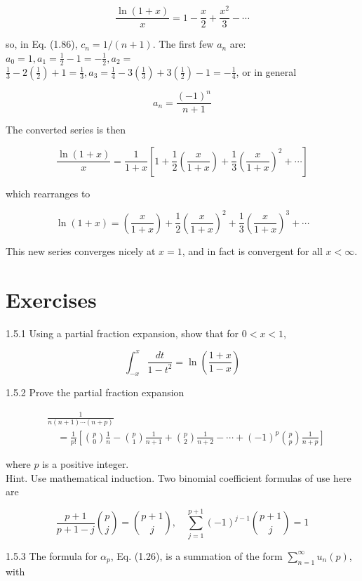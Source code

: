 \documentclass[10pt]{article}
\begin{document}
\begin{equation*}
\frac{\ln (1+x)}{x}=1-\frac{x}{2}+\frac{x^{2}}{3}-\cdots \tag{1.89}
\end{equation*}


so, in Eq. (1.86), $c_{n}=1 /(n+1)$. The first few $a_{n}$ are: $a_{0}=1, a_{1}=\frac{1}{2}-1=-\frac{1}{2}, a_{2}=$ $\frac{1}{3}-2\left(\frac{1}{2}\right)+1=\frac{1}{3}, a_{3}=\frac{1}{4}-3\left(\frac{1}{3}\right)+3\left(\frac{1}{2}\right)-1=-\frac{1}{4}$, or in general

$$
a_{n}=\frac{(-1)^{n}}{n+1}
$$

The converted series is then

$$
\frac{\ln (1+x)}{x}=\frac{1}{1+x}\left[1+\frac{1}{2}\left(\frac{x}{1+x}\right)+\frac{1}{3}\left(\frac{x}{1+x}\right)^{2}+\cdots\right]
$$

which rearranges to


\begin{equation*}
\ln (1+x)=\left(\frac{x}{1+x}\right)+\frac{1}{2}\left(\frac{x}{1+x}\right)^{2}+\frac{1}{3}\left(\frac{x}{1+x}\right)^{3}+\cdots \tag{1.90}
\end{equation*}


This new series converges nicely at $x=1$, and in fact is convergent for all $x<\infty$.

\section*{Exercises}
1.5.1 Using a partial fraction expansion, show that for $0<x<1$,

$$
\int_{-x}^{x} \frac{d t}{1-t^{2}}=\ln \left(\frac{1+x}{1-x}\right)
$$

1.5.2 Prove the partial fraction expansion

$$
\begin{aligned}
& \frac{1}{n(n+1) \cdots(n+p)} \\
& \quad=\frac{1}{p!}\left[\binom{p}{0} \frac{1}{n}-\binom{p}{1} \frac{1}{n+1}+\binom{p}{2} \frac{1}{n+2}-\cdots+(-1)^{p}\binom{p}{p} \frac{1}{n+p}\right]
\end{aligned}
$$

where $p$ is a positive integer.\\
Hint. Use mathematical induction. Two binomial coefficient formulas of use here are

$$
\frac{p+1}{p+1-j}\binom{p}{j}=\binom{p+1}{j}, \quad \sum_{j=1}^{p+1}(-1)^{j-1}\binom{p+1}{j}=1
$$

1.5.3 The formula for $\alpha_{p}$, Eq. (1.26), is a summation of the form $\sum_{n=1}^{\infty} u_{n}(p)$, with
\end{document}
